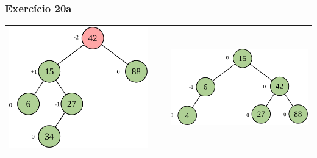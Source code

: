 \documentclass[aspectratio=169]{beamer}
\begin{document}
\begin{frame}[fragile]\frametitle{Exercício 20a}
\begin{tabular}{lll}
\includegraphics[height=0.45\paperheight]{imagens/avl19c.png} & ~ ~ &
\includegraphics[height=0.33\paperheight]{imagens/avl19d.png} \\
\end{tabular}
\end{frame}
\end{document}
